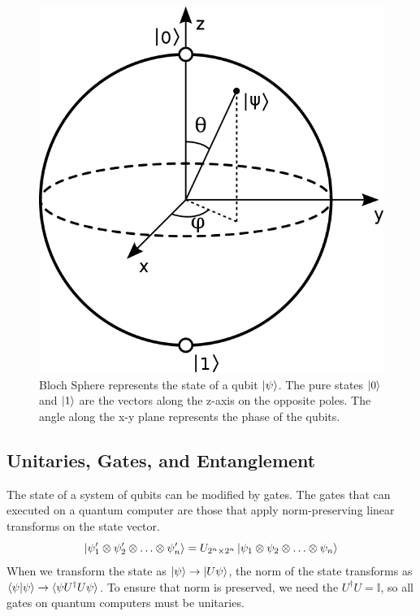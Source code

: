 \begin{figure}[ht]
    \centering
    \includegraphics[width=0.5\linewidth]{figures/quantum/bloch_sphere.png}
    \caption[Block Sphere representation of Quantum States]{Bloch Sphere represents the state of a qubit $\ket{\psi}$. The pure states $\ket{0}$ and $\ket{1}$ are the vectors along the z-axis on the opposite poles. The angle along the x-y plane represents the phase of the qubits.}
    \label{fig:bloch-sphere}
\end{figure}


\subsection{Unitaries, Gates, and Entanglement}
\label{sec:background-unitary-gate-entanglement}

The state of a system of qubits can be modified by gates. The  gates that can executed on a quantum computer are those that apply norm-preserving linear transforms on the state vector.
\begin{equation}
    \ket{\psi_1^\prime \otimes \psi_2^\prime \otimes \ldots \otimes \psi_n^\prime} = U_{2^n \times 2^n} \ket{\psi_1 \otimes \psi_2 \otimes \ldots \otimes \psi_n}
\end{equation}
When we transform the state as $\ket{\psi} \rightarrow \ket{U \psi}$, the norm of the state transforms as $\braket{\psi | \psi} \rightarrow \braket{\psi U^\dagger U \psi}$. To ensure that norm is preserved, we need the $U^\dagger U = \mathbb{I}$, so all gates on quantum computers must be unitaries.


